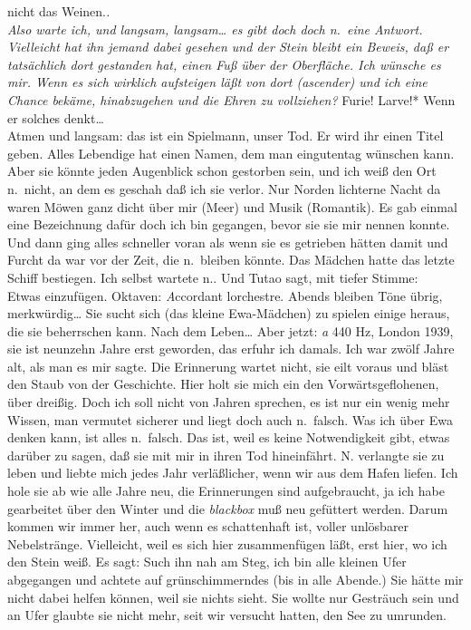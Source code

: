 \documentclass[
]{article}
\begin{document}
nicht das Weinen.\emph{.\\
Also warte ich, und langsam, langsam\ldots{} es gibt doch doch n.~eine
Antwort. Vielleicht hat ihn jemand dabei gesehen und der Stein bleibt
ein Beweis, daß er tatsächlich dort gestanden hat, einen Fuß über der
Oberfläche. Ich wünsche es mir. Wenn es sich wirklich aufsteigen läßt
von dort (ascender) und ich eine Chance bekäme, hinabzugehen und die
Ehren zu vollziehen? }Furie! Larve!* Wenn er solches denkt\ldots{}\\
Atmen und langsam: das ist ein Spielmann, unser Tod. Er wird ihr einen
Titel geben. Alles Lebendige hat einen Namen, dem man eingutentag
wünschen kann. Aber sie könnte jeden Augenblick schon gestorben sein,
und ich weiß den Ort n.~nicht, an dem es geschah daß ich sie verlor. Nur
Norden lichterne Nacht da waren Möwen ganz dicht über mir (Meer) und
Musik (Romantik). Es gab einmal eine Bezeichnung dafür doch ich bin
gegangen, bevor sie sie mir nennen konnte. Und dann ging alles schneller
voran als wenn sie es getrieben hätten damit und Furcht da war vor der
Zeit, die n.~bleiben könnte. Das Mädchen hatte das letzte Schiff
bestiegen. Ich selbst wartete n.. Und Tutao sagt, mit tiefer Stimme:\\
Etwas einzufügen. Oktaven: \emph{A}ccordant l\textquotesingle orchestre.
Abends bleiben Töne übrig, merkwürdig\ldots{} Sie sucht sich (das kleine
Ewa-Mädchen) zu spielen einige heraus, die sie beherrschen kann. Nach
dem Leben\ldots{} Aber jetzt: \emph{a\textquotesingle{}} 440 Hz, London
1939, sie ist neunzehn Jahre erst geworden, das erfuhr ich damals. Ich
war zwölf Jahre alt, als man es mir sagte. Die Erinnerung wartet nicht,
sie eilt voraus und bläst den Staub von der Geschichte. Hier holt sie
mich ein den Vorwärtsgeflohenen, über dreißig. Doch ich soll nicht von
Jahren sprechen, es ist nur ein wenig mehr Wissen, man vermutet sicherer
und liegt doch auch n.~falsch. Was ich über Ewa denken kann, ist alles
n.~falsch. Das ist, weil es keine Notwendigkeit gibt, etwas darüber zu
sagen, daß sie mit mir in ihren Tod hineinfährt. N. verlangte sie zu
leben und liebte mich jedes Jahr verläßlicher, wenn wir aus dem Hafen
liefen. Ich hole sie ab wie alle Jahre neu, die Erinnerungen sind
aufgebraucht, ja ich habe gearbeitet über den Winter und die
\emph{blackbox} muß neu gefüttert werden. Darum kommen wir immer her,
auch wenn es schattenhaft ist, voller unlösbarer Nebelstränge.
Vielleicht, weil es sich hier zusammenfügen läßt, erst hier, wo ich den
Stein weiß. Es sagt: Such ihn nah am Steg, ich bin alle kleinen Ufer
abgegangen und achtete auf grünschimmerndes (bis in alle Abende.) Sie
hätte mir nicht dabei helfen können, weil sie nichts sieht. Sie wollte
nur Gesträuch sein und an Ufer glaubte sie nicht mehr, seit wir versucht
hatten, den See zu umrunden.
\end{document}
